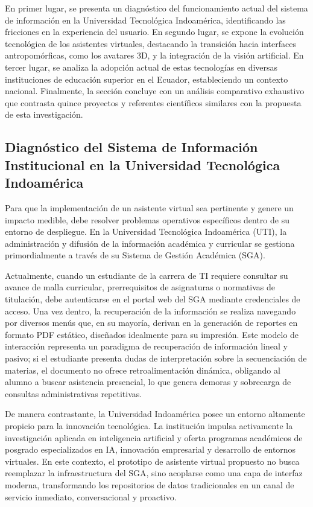 En primer lugar, se presenta un diagnóstico del funcionamiento actual del sistema de información en la Universidad Tecnológica Indoamérica, identificando las fricciones en la experiencia del usuario. En segundo lugar, se expone la evolución tecnológica de los asistentes virtuales, destacando la transición hacia interfaces antropomórficas, como los avatares 3D, y la integración de la visión artificial. En tercer lugar, se analiza la adopción actual de estas tecnologías en diversas instituciones de educación superior en el Ecuador, estableciendo un contexto nacional. Finalmente, la sección concluye con un análisis comparativo exhaustivo que contrasta quince proyectos y referentes científicos similares con la propuesta de esta investigación.

\subsection{Diagnóstico del Sistema de Información Institucional en la Universidad Tecnológica Indoamérica}
Para que la implementación de un asistente virtual sea pertinente y genere un impacto medible, debe resolver problemas operativos específicos dentro de su entorno de despliegue. En la Universidad Tecnológica Indoamérica (UTI), la administración y difusión de la información académica y curricular se gestiona primordialmente a través de su Sistema de Gestión Académica (SGA).

Actualmente, cuando un estudiante de la carrera de TI requiere consultar su avance de malla curricular, prerrequisitos de asignaturas o normativas de titulación, debe autenticarse en el portal web del SGA mediante credenciales de acceso. Una vez dentro, la recuperación de la información se realiza navegando por diversos menús que, en su mayoría, derivan en la generación de reportes en formato PDF estático, diseñados idealmente para su impresión. Este modelo de interacción representa un paradigma de recuperación de información lineal y pasivo; si el estudiante presenta dudas de interpretación sobre la secuenciación de materias, el documento no ofrece retroalimentación dinámica, obligando al alumno a buscar asistencia presencial, lo que genera demoras y sobrecarga de consultas administrativas repetitivas.

De manera contrastante, la Universidad Indoamérica posee un entorno altamente propicio para la innovación tecnológica. La institución impulsa activamente la investigación aplicada en inteligencia artificial y oferta programas académicos de posgrado especializados en IA, innovación empresarial y desarrollo de entornos virtuales. En este contexto, el prototipo de asistente virtual propuesto no busca reemplazar la infraestructura del SGA, sino acoplarse como una capa de interfaz moderna, transformando los repositorios de datos tradicionales en un canal de servicio inmediato, conversacional y proactivo.

